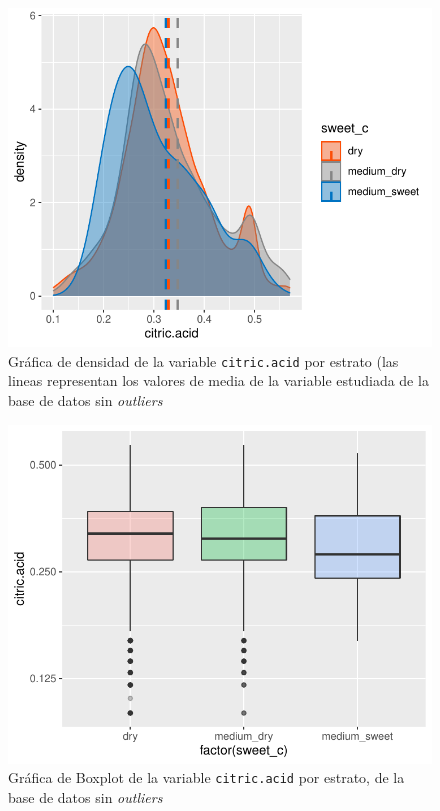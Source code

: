 \documentclass[
]{article}
\begin{document}
\begin{figure}
\centering
\includegraphics{muestreo_estratificado_final_files/figure-latex/desity_plot tidy-1.pdf}
\caption{Gráfica de densidad de la variable \texttt{citric.acid} por
estrato (las lineas representan los valores de media de la variable
estudiada de la base de datos sin \emph{outliers}}
\end{figure}

\begin{figure}
\centering
\includegraphics{muestreo_estratificado_final_files/figure-latex/Boxplot tidy-1.pdf}
\caption{Gráfica de Boxplot de la variable \texttt{citric.acid} por
estrato, de la base de datos sin \emph{outliers}}
\end{figure}
\end{document}
